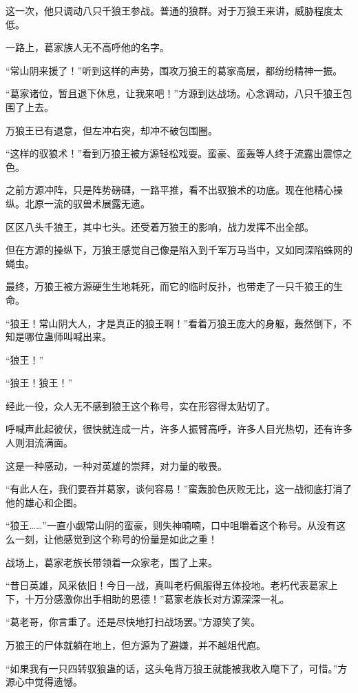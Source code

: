 \begin{this_body}
这一次，他只调动八只千狼王参战。普通的狼群。对于万狼王来讲，威胁程度太低。

一路上，葛家族人无不高呼他的名字。

“常山阴来援了！”听到这样的声势，围攻万狼王的葛家高层，都纷纷精神一振。

“葛家诸位，暂且退下休息，让我来吧！”方源到达战场。心念调动，八只千狼王包围了上去。

万狼王已有退意，但左冲右突，却冲不破包围圈。

“这样的驭狼术！”看到万狼王被方源轻松戏耍。蛮豪、蛮轰等人终于流露出震惊之色。

之前方源冲阵，只是阵势磅礴，一路平推，看不出驭狼术的功底。现在他精心操纵。北原一流的驭兽术展露无遗。

区区八头千狼王，其中七头。还受着万狼王的影响，战力发挥不出全部。

但在方源的操纵下，万狼王感觉自己像是陷入到千军万马当中，又如同深陷蛛网的蝇虫。

最终，万狼王被方源硬生生地耗死，而它的临时反扑，也带走了一只千狼王的生命。

“狼王！常山阴大人，才是真正的狼王啊！”看着万狼王庞大的身躯，轰然倒下，不知是哪位蛊师叫喊出来。

“狼王！”

“狼王！狼王！”

经此一役，众人无不感到狼王这个称号，实在形容得太贴切了。

呼喊声此起彼伏，很快就连成一片，许多人振臂高呼，许多人目光热切，还有许多人则泪流满面。

这是一种感动，一种对英雄的崇拜，对力量的敬畏。

“有此人在，我们要吞并葛家，谈何容易！”蛮轰脸色灰败无比，这一战彻底打消了他的雄心和企图。

“狼王……”一直小觑常山阴的蛮豪，则失神喃喃，口中咀嚼着这个称号。从没有这么一刻，让他感觉到这个称号的份量是如此之重！

战场上，葛家老族长带领着一众家老，围了上来。

“昔日英雄，风采依旧！今日一战，真叫老朽佩服得五体投地。老朽代表葛家上下，十万分感激你出手相助的恩德！”葛家老族长对方源深深一礼。

“葛老哥，你言重了。还是尽快地打扫战场罢。”方源笑了笑。

万狼王的尸体就躺在地上，但方源为了避嫌，并不越俎代庖。

“如果我有一只四转驭狼蛊的话，这头龟背万狼王就能被我收入麾下了，可惜。”方源心中觉得遗憾。


\end{this_body}
